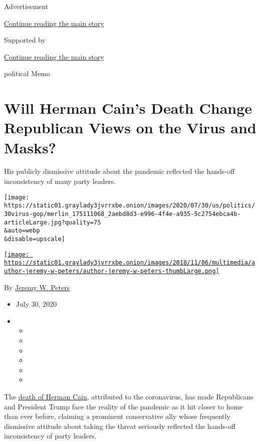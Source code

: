Advertisement

\protect\hyperlink{after-top}{Continue reading the main story}

Supported by

\protect\hyperlink{after-sponsor}{Continue reading the main story}

political Memo

\hypertarget{will-herman-cains-death-change-republican-views-on-the-virus-and-masks}{%
\section{Will Herman Cain's Death Change Republican Views on the Virus
and
Masks?}\label{will-herman-cains-death-change-republican-views-on-the-virus-and-masks}}

His publicly dismissive attitude about the pandemic reflected the
hands-off inconsistency of many party leaders.

\texttt{[image: https://static01.graylady3jvrrxbe.onion/images/2020/07/30/us/politics/30virus-gop/merlin\_175111068\_2aebd8d3-e996-4f4e-a935-5c2754ebca4b-articleLarge.jpg?quality=75\\\&auto=webp\\\&disable=upscale]}

\href{https://www.nytimes3xbfgragh.onion/by/jeremy-w-peters}{\texttt{[image: https://static01.graylady3jvrrxbe.onion/images/2018/11/06/multimedia/author-jeremy-w-peters/author-jeremy-w-peters-thumbLarge.png]}}

By \href{https://www.nytimes3xbfgragh.onion/by/jeremy-w-peters}{Jeremy
W. Peters}

\begin{itemize}
\item
  July 30, 2020
\item
  \begin{itemize}
  \item
  \item
  \item
  \item
  \item
  \item
  \end{itemize}
\end{itemize}

The
\href{https://www.nytimes3xbfgragh.onion/2020/07/30/us/politics/herman-cain-dead.html}{death
of Herman Cain}, attributed to the coronavirus, has made Republicans and
President Trump face the reality of the pandemic as it hit closer to
home than ever before, claiming a prominent conservative ally whose
frequently dismissive attitude about taking the threat seriously
reflected the hands-off inconsistency of party leaders.

